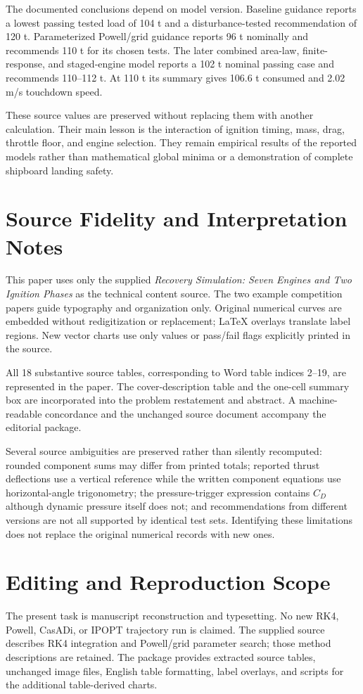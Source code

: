 \documentclass[11pt,a4paper]{article}
\begin{document}
The documented conclusions depend on model version. Baseline guidance reports a lowest passing tested load of 104 t and a disturbance-tested recommendation of 120 t. Parameterized Powell/grid guidance reports 96 t nominally and recommends 110 t for its chosen tests. The later combined area-law, finite-response, and staged-engine model reports a 102 t nominal passing case and recommends 110--112 t. At 110 t its summary gives 106.6 t consumed and 2.02 m/s touchdown speed.

These source values are preserved without replacing them with another calculation. Their main lesson is the interaction of ignition timing, mass, drag, throttle floor, and engine selection. They remain empirical results of the reported models rather than mathematical global minima or a demonstration of complete shipboard landing safety.

\clearpage
\appendix
\section{Source Fidelity and Interpretation Notes}
This paper uses only the supplied \emph{Recovery Simulation: Seven Engines and Two Ignition Phases} as the technical content source. The two example competition papers guide typography and organization only. Original numerical curves are embedded without redigitization or replacement; LaTeX overlays translate label regions. New vector charts use only values or pass/fail flags explicitly printed in the source.

All 18 substantive source tables, corresponding to Word table indices 2--19, are represented in the paper. The cover-description table and the one-cell summary box are incorporated into the problem restatement and abstract. A machine-readable concordance and the unchanged source document accompany the editorial package.

Several source ambiguities are preserved rather than silently recomputed: rounded component sums may differ from printed totals; reported thrust deflections use a vertical reference while the written component equations use horizontal-angle trigonometry; the pressure-trigger expression contains $C_D$ although dynamic pressure itself does not; and recommendations from different versions are not all supported by identical test sets. Identifying these limitations does not replace the original numerical records with new ones.

\section{Editing and Reproduction Scope}
The present task is manuscript reconstruction and typesetting. No new RK4, Powell, CasADi, or IPOPT trajectory run is claimed. The supplied source describes RK4 integration and Powell/grid parameter search; those method descriptions are retained. The package provides extracted source tables, unchanged image files, English table formatting, label overlays, and scripts for the additional table-derived charts.
\end{document}
